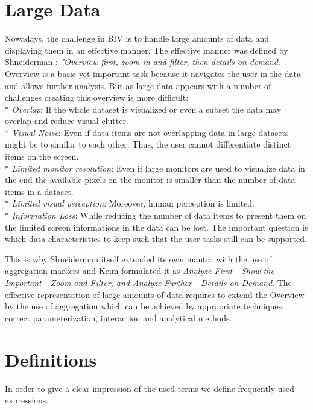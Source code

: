 \section{Large Data}
Nowadays, the challenge in BIV is to handle large amounts of data and displaying them in an effective manner. The effective manner was defined by Shneiderman \cite{paterno1997concurtasktrees, Shneiderman2008, Keim2008}: \textit{"Overview first, zoom in and filter, then details on demand}. Overview is a basic yet important task because it navigates the user in the data and allows further analysis. But as large data appears with a number of challenges creating this overview is more difficult:
\\*
\textit{Overlap}: 
If the whole dataset is visualized or even a subset the data may overlap and reduce visual clutter.
\\*
\textit{Visual Noise}: 
Even if data items are not overlapping data in large datasets might be to similar to each other. Thus, the user cannot differentiate distinct items on the screen.
\\*
\textit{Limited monitor resolution}:
Even if large monitors are used to visualize data in the end the available pixels on the monitor is smaller than the number of data items in a dataset. 
\\*
\textit{Limited visual perception}:
Moreover, human perception is limited.
\\*
\textit{Information Loss}:
While reducing the number of data items to present them on the limited screen informations in the data can be lost. The important question is which data characteristics to keep such that the user tasks still can be supported.

This is why Shneiderman itself extended its own mantra with the use of aggregation markers and Keim formulated it as \textit{Analyze First - Show the Important - Zoom and Filter, and Analyze Further - Details on Demand}\cite{Keima}. The effective representation of large amounts of data requires to extend the Overview by the use of aggregation which can be achieved by appropriate techniques, correct parameterization, interaction and analytical methods\cite{Aigner2008}. 







\section{Definitions}
In order to give a clear impression of the used terms we define frequently used expressions.

